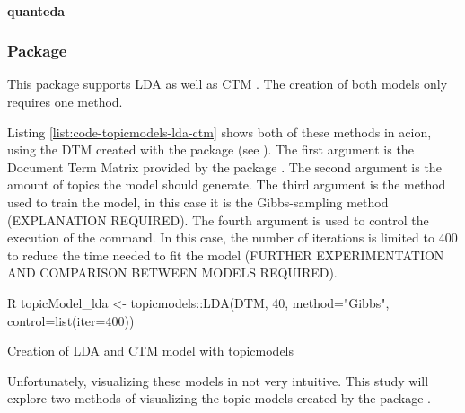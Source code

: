 \paragraph{quanteda} 

\subsubsection{Package }\label{sec:topicmodels-package}

This package supports LDA as well as CTM \cite{Grün2023-topicmodels}. The creation of both models only requires one method. 

Listing \ref{list:code-topicmodels-lda-ctm} shows both of these methods in acion, using the DTM created with the package  (see ). The first argument is the Document Term Matrix provided by the package . The second argument is the amount of topics the model should generate. The third argument is the method used to train the model, in this case it is the Gibbs-sampling method (EXPLANATION REQUIRED). The fourth argument is used to control the execution of the command. In this case, the number of iterations is limited to 400 to reduce the time needed to fit the model (FURTHER EXPERIMENTATION AND COMPARISON BETWEEN MODELS REQUIRED).

\begin{listing}
    \begin{code}{R}
        topicModel_lda <- topicmodels::LDA(DTM, 40, method="Gibbs", control=list(iter=400))
    \end{code}
    \caption{Creation of LDA and CTM model with topicmodels}
    \label{list:code-topicmodels-lda-ctm}
\end{listing}


Unfortunately, visualizing these models in not very intuitive. This study will explore two methods of visualizing the topic models created by the package . 

